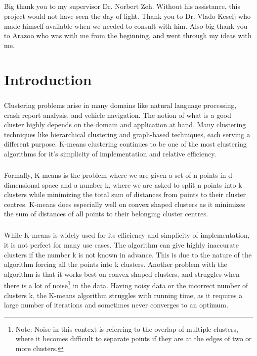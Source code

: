 \documentclass[12pt]{dalthesis}
\begin{document}
\begin{acknowledgements}
  \paragraph{}
  Big thank you to my supervisor Dr. Norbert Zeh. Without his assistance, this project would not have seen the day of light. Thank you to Dr. Vlado Keselj who made himself available when we needed to consult with him. Also big thank you to Arazoo who was with me from the beginning, and went through my ideas with me.
\end{acknowledgements}

\mainmatter


\chapter{Introduction}
\paragraph{}
Clustering problems arise in many domains like
natural language processing\cite{ravichandran2005randomized},
crash report analysis\cite{soto2016machine}, 
and vehicle navigation\cite{maio1996dynamic}.
The notion of what is a good cluster highly depends on the domain and application at hand. Many clustering techniques like hierarchical clustering\cite{corpet1988multiple}
and graph-based techniques\cite{schaeffer2007graph}, each serving a different purpose. K-means clustering continues to be one of the most clustering algorithms for it's simplicity of implementation and relative efficiency\cite{jain2010data}.
\paragraph{}
Formally, K-means is the problem where we are given a set of n points in d-dimensional space and a number k, where we are asked to split n points into k clusters while minimizing the total sum of distances from points to their cluster centres. K-means does especially well on convex shaped clusters as it minimizes the sum of distances of all points to their belonging cluster centres.

\paragraph{}
While K-means is widely used for its efficiency and simplicity of implementation, it is not perfect for many use cases. The algorithm can give highly inaccurate clusters if the number k is not known in advance. This is due to the nature of the algorithm forcing all the points into k clusters. Another problem with the algorithm is that it works best on convex shaped clusters, and struggles when there is a lot of noise\footnote{Note: Noise in this context is referring to the overlap of multiple clusters, where it becomes difficult to separate points if they are at the edges of two or more clusters.} in the data. Having noisy data or the incorrect number of clusters k, the K-means algorithm struggles with running time, as it requires a large number of iterations and sometimes never converges to an optimum.
\end{document}
